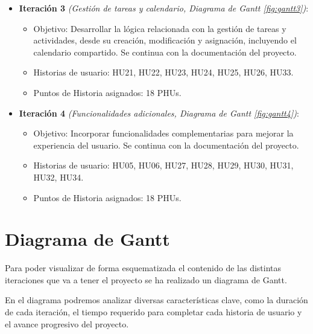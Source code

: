 \begin{itemize}
    \item \textbf{Iteración 3} \textit{(Gestión de tareas y calendario, Diagrama de Gantt \ref{fig:gantt3})}:
    \begin{itemize}
        \item Objetivo: Desarrollar la lógica relacionada con la gestión de tareas y actividades, desde su creación, modificación y asignación, incluyendo el calendario compartido. Se continua con la documentación del proyecto.
        \item Historias de usuario: HU21, HU22, HU23, HU24, HU25, HU26, HU33.
        \item Puntos de Historia asignados: 18 PHUs.
    \end{itemize}
    
    \item \textbf{Iteración 4} \textit{(Funcionalidades adicionales, Diagrama de Gantt  \ref{fig:gantt4})}:
    \begin{itemize}
        \item Objetivo: Incorporar funcionalidades complementarias para mejorar la experiencia del usuario. Se continua con la documentación del proyecto.
        \item Historias de usuario: HU05, HU06, HU27, HU28, HU29, HU30, HU31, HU32, HU34.
        \item Puntos de Historia asignados: 18 PHUs.
    \end{itemize}
\end{itemize}

\section{Diagrama de Gantt}

Para poder visualizar de forma esquematizada el contenido de las distintas iteraciones que va a tener el proyecto se ha realizado un diagrama de Gantt.

En el diagrama podremos analizar diversas características clave, como la duración de cada iteración, el tiempo requerido para completar cada historia de usuario y el avance progresivo del proyecto.

